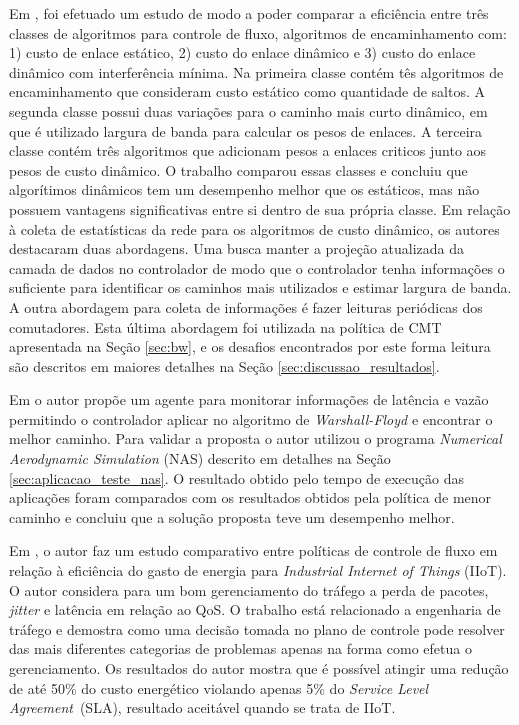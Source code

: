 Em \cite{akin2019comparison}, foi efetuado um estudo de modo a poder comparar a eficiência entre três classes de algoritmos para controle de fluxo, algoritmos de encaminhamento com: 1) custo de enlace estático, 2) custo do enlace dinâmico e 3) custo do enlace dinâmico com interferência mínima. Na primeira classe contém tês algoritmos de encaminhamento que consideram custo estático como quantidade de saltos. A segunda classe possui duas variações para o caminho mais curto dinâmico, em que é utilizado largura de banda para calcular os pesos de enlaces. A terceira classe contém três algoritmos que adicionam pesos a enlaces criticos junto aos pesos de custo dinâmico. O trabalho comparou essas classes e concluiu que algorítimos dinâmicos tem um desempenho melhor que os estáticos, mas não possuem vantagens significativas entre si dentro de sua própria classe. Em relação à coleta de estatísticas da rede para os algoritmos de custo dinâmico, os autores destacaram duas abordagens. Uma busca manter a projeção atualizada da camada de dados no controlador de modo que o controlador tenha informações o suficiente para identificar os caminhos mais utilizados e estimar largura de banda. A outra abordagem para coleta de informações é fazer leituras periódicas dos comutadores. Esta última abordagem foi utilizada na política de CMT apresentada na Seção \ref{sec:bw}, e os desafios encontrados por este forma leitura são descritos em maiores detalhes na Seção \ref{sec:discussao_resultados}. 

Em \cite{ichikawa2013network} o autor propõe um agente para monitorar informações de latência e vazão permitindo o controlador aplicar no algoritmo de \textit{Warshall-Floyd} e encontrar o melhor caminho. Para validar a proposta o autor utilizou o programa \textit{Numerical Aerodynamic Simulation} (NAS) descrito em detalhes na Seção \ref{sec:aplicacao_teste_nas}. O resultado obtido pelo tempo de execução das aplicações foram comparados com os resultados obtidos pela política de menor caminho e concluiu que a solução proposta teve um desempenho melhor. 

Em \cite{naeem2020sdn}, o autor faz um estudo comparativo entre políticas de controle de fluxo em relação à eficiência do gasto de energia para \textit{Industrial Internet of Things} (IIoT). O autor considera para um bom gerenciamento do tráfego a perda de pacotes, \textit{jitter} e latência em relação ao QoS. O trabalho está relacionado a engenharia de tráfego e demostra como uma decisão tomada no plano de controle pode resolver das mais diferentes categorias de problemas apenas na forma como efetua o gerenciamento. Os resultados do autor mostra que é possível atingir uma redução de até 50\% do custo energético violando apenas 5\% do \textit{Service Level Agreement}~(SLA), resultado aceitável quando se trata de IIoT.

